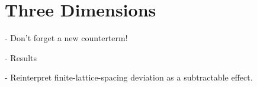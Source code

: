 \section{Three Dimensions}\label{sec:3D}

- Don't forget a new counterterm!

- Results

- Reinterpret finite-lattice-spacing deviation as a subtractable effect.
